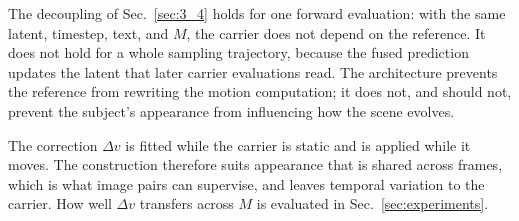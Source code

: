 The decoupling of Sec.~\ref{sec:3_4} holds for one forward evaluation: with the same latent, timestep, text, and $M$, the carrier does not depend on the reference. It does not hold for a whole sampling trajectory, because the fused prediction updates the latent that later carrier evaluations read. The architecture prevents the reference from rewriting the motion computation; it does not, and should not, prevent the subject's appearance from influencing how the scene evolves.

The correction $\Delta v$ is fitted while the carrier is static and is applied while it moves. The construction therefore suits appearance that is shared across frames, which is what image pairs can supervise, and leaves temporal variation to the carrier. How well $\Delta v$ transfers across $M$ is evaluated in Sec.~\ref{sec:experiments}.
